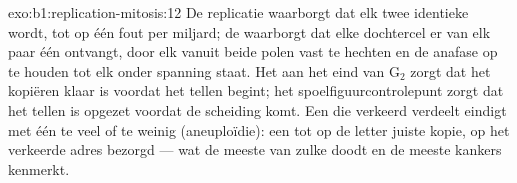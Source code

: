 \begin{solution}{exo:b1:replication-mitosis:12}
De replicatie waarborgt dat elk  twee identieke  wordt, tot op
één fout per miljard; de  waarborgt dat elke dochtercel er van elk paar
één ontvangt, door elk  vanuit beide polen vast te hechten en de anafase
op te houden tot elk  onder spanning staat. Het  aan het eind
van G$_2$ zorgt dat het kopiëren klaar is voordat het tellen begint; het
spoelfiguurcontrolepunt zorgt dat het tellen is opgezet voordat de scheiding komt.
Een  die verkeerd verdeelt eindigt met één  te veel of te weinig
(aneuploïdie): een tot op de letter juiste kopie, op het verkeerde adres bezorgd
--- wat de meeste van zulke  doodt en de meeste kankers kenmerkt.
\end{solution}

